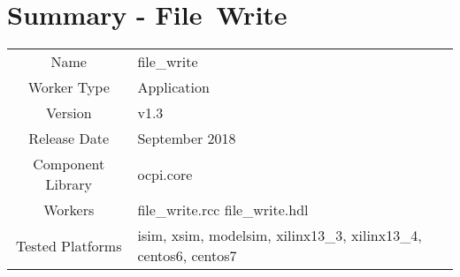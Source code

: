 \documentclass{article}
\author{} %
\date{Version \docVersion} %
\title{\docTitle}
\def\docVersion{1.3}
\def\comp{file\_write}
\def\Comp{File\ Write }
\begin{document}
\section*{Summary - \Comp}
\begin{tabular}{|c|M{13.5cm}|}
	\hline
	                  &                                                                                \\
	\hline
	Name              & \comp                                                                          \\
	\hline
	Worker Type       & Application                                                                    \\
	\hline
	Version           &  v\docVersion \\
	\hline
	Release Date      &  September 2018 \\
	\hline
	Component Library &   ocpi.core\\
	\hline
	Workers           &  file\_write.rcc file\_write.hdl\\
	\hline
	Tested Platforms  &  isim, xsim, modelsim, xilinx13\_3, xilinx13\_4, centos6, centos7\\
	\hline
\end{tabular}
\end{document}
